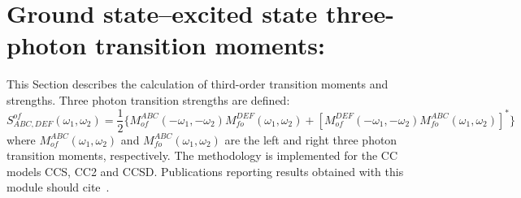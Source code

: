 
\section{Ground state--excited state three-photon 
transition moments: }\label{sec:cctm}

This Section describes the calculation of third-order transition
moments and strengths. Three photon transition strengths are defined:
{\small \[
S^{of}_{ABC,DEF}(\omega_1,\omega_2) = \frac{1}{2} 
       \{ M^{ABC}_{of}(-\omega_1,-\omega_2) M^{DEF}_{fo}(\omega_1,\omega_2)
        +[M^{DEF}_{of}(-\omega_1,-\omega_2) M^{ABC}_{fo}(\omega_1,\omega_2)]^\ast\}
\] }
where $M^{ABC}_{of}(\omega_1,\omega_2)$ and $M^{ABC}_{fo}(\omega_1,\omega_2)$
are the left and right three photon transition moments, respectively.
The methodology is implemented for the CC models CCS, CC2 and CCSD.
Publications reporting results obtained with this module should cite~\cite{}.

